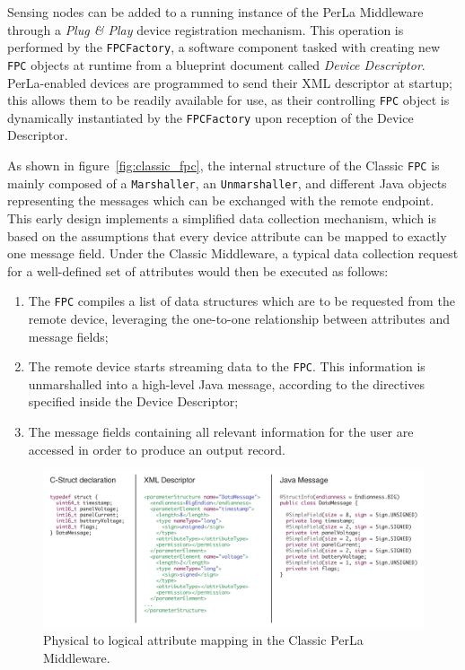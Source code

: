 Sensing nodes can be added to a running instance of the PerLa Middleware
through a \textit{Plug \& Play} device registration mechanism. This operation
is performed by the \texttt{FPCFactory}, a software component tasked with
creating new \texttt{FPC} objects at runtime from a blueprint document called
\textit{Device Descriptor}. PerLa-enabled devices are programmed to send their
XML descriptor at startup; this allows them to be readily available for use, as
their controlling \texttt{FPC} object is dynamically instantiated by the
\texttt{FPCFactory} upon reception of the Device Descriptor.

As shown in figure~\ref{fig:classic_fpc}, the internal structure of the Classic
\texttt{FPC} is mainly composed of a \texttt{Marshaller}, an
\texttt{Unmarshaller}, and different Java objects representing the messages
which can be exchanged with the remote endpoint. This early design implements a
simplified data collection mechanism, which is based on the assumptions that
every device attribute can be mapped to exactly one message field. Under the
Classic Middleware, a typical data collection request for a well-defined set of
attributes would then be executed as follows:

\begin{enumerate}

    \item The \texttt{FPC} compiles a list of data structures which are to be
        requested from the remote device, leveraging the one-to-one
        relationship between attributes and message fields;

    \item The remote device starts streaming data to the \texttt{FPC}. This
        information is unmarshalled into a high-level Java message, according
        to the directives specified inside the Device Descriptor;

    \item The message fields containing all relevant information for the user
        are accessed in order to produce an output record.

\end{enumerate}

\begin{figure}[h!]
\includegraphics[width=\textwidth]{imgs/classic_descriptor.pdf}
\caption{Physical to logical attribute mapping in the Classic PerLa Middleware.}
\label{fig:classic_descriptor}
\end{figure}

